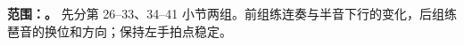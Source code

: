 \textbf{范围：\CurrentSegmentRange。} 先分第 26--33、34--41 小节两组。前组练连奏与半音下行的变化，后组练琶音的换位和方向；保持左手拍点稳定。
\SegmentScore
